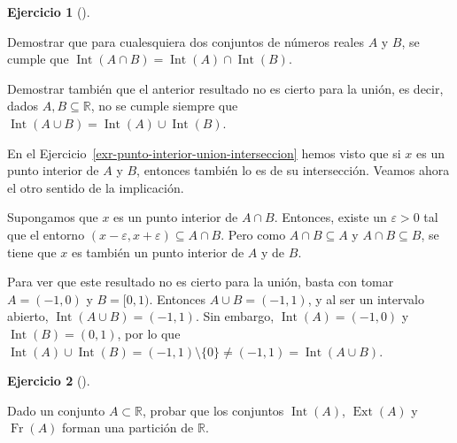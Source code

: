 \documentclass[
  spanish,
  a4paper,
]{scrreport}
\theoremstyle{definition}
\newtheorem{exercise}{Ejercicio}[chapter]
\theoremstyle{remark}
\begin{document}
\begin{exercise}[]\protect\hypertarget{exr-interior-union-interseccion}{}\label{exr-interior-union-interseccion}

Demostrar que para cualesquiera dos conjuntos de números reales \(A\) y
\(B\), se cumple que
\(\operatorname{Int}(A\cap B) = \operatorname{Int}(A)  \cap \operatorname{Int}(B)\).

Demostrar también que el anterior resultado no es cierto para la unión,
es decir, dados \(A,B\subseteq \mathbb{R}\), no se cumple siempre que
\(\operatorname{Int}(A\cup B) = \operatorname{Int}(A)  \cup  \operatorname{Int}(B)\).

\end{exercise}

\begin{tcolorbox}[enhanced jigsaw, arc=.35mm, bottomrule=.15mm, bottomtitle=1mm, breakable, colback=white, colbacktitle=quarto-callout-tip-color!10!white, colframe=quarto-callout-tip-color-frame, coltitle=black, left=2mm, leftrule=.75mm, opacityback=0, opacitybacktitle=0.6, rightrule=.15mm, title=\textcolor{quarto-callout-tip-color}{\faLightbulb}\hspace{0.5em}{Solución}, titlerule=0mm, toprule=.15mm, toptitle=1mm]

En el Ejercicio~\ref{exr-punto-interior-union-interseccion} hemos visto
que si \(x\) es un punto interior de \(A\) y \(B\), entonces también lo
es de su intersección. Veamos ahora el otro sentido de la implicación.

Supongamos que \(x\) es un punto interior de \(A\cap B\). Entonces,
existe un \(\varepsilon>0\) tal que el entorno
\((x-\varepsilon, x+\varepsilon)\subseteq A\cap B\). Pero como
\(A\cap B\subseteq A\) y \(A\cap B\subseteq B\), se tiene que \(x\) es
también un punto interior de \(A\) y de \(B\).

Para ver que este resultado no es cierto para la unión, basta con tomar
\(A=(-1,0)\) y \(B=[0,1)\). Entonces \(A\cup B=(-1,1)\), y al ser un
intervalo abierto, \(\operatorname{Int}(A\cup B)=(-1,1)\). Sin embargo,
\(\operatorname{Int}(A)=(-1,0)\) y \(\operatorname{Int}(B)=(0,1)\), por
lo que
\(\operatorname{Int}(A)\cup \operatorname{Int}(B)=(-1,1)\setminus\{0\}\neq (-1,1)= \operatorname{Int}(A\cup B)\).

\end{tcolorbox}

\begin{exercise}[]\protect\hypertarget{exr-particion-interior-exterior-frontera}{}\label{exr-particion-interior-exterior-frontera}

Dado un conjunto \(A\subset\mathbb{R}\), probar que los conjuntos
\(\operatorname{Int}(A)\), \(\operatorname{Ext}(A)\) y
\(\operatorname{Fr}(A)\) forman una partición de \(\mathbb{R}\).

\end{exercise}
\end{document}
